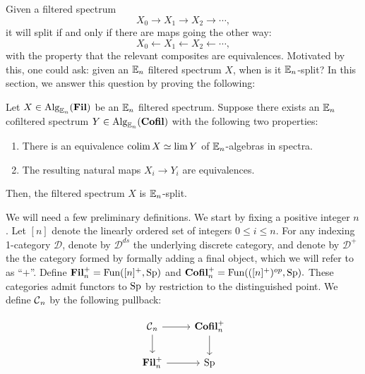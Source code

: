 
Given a filtered spectrum $$X_0\longrightarrow X_1 \longrightarrow X_2 \longrightarrow \cdots ,$$ it will split if and only if there are maps going the other way: $$X_0 \longleftarrow X_1 \longleftarrow X_2 \longleftarrow \cdots,$$ with the property that the relevant composites are equivalences.  Motivated by this, one could ask: given an $\operatorname{\mathbb{E}}_n$ filtered spectrum $X$, when is it $\operatorname{\mathbb{E}}_n$-split?  In this section, we answer this question by proving the following:

\begin{thm}\label{thm:SplitMachine}
Let $X\in \operatorname{\text{Alg}}_{\operatorname{\mathbb{E}}_n}(\operatorname{\textbf{Fil}})$ be an $\operatorname{\mathbb{E}}_n$ filtered spectrum.  Suppose there exists an $\operatorname{\mathbb{E}}_n$ cofiltered spectrum $Y\in \operatorname{\text{Alg}}_{\operatorname{\mathbb{E}}_n}(\operatorname{\textbf{Cofil}})$ with the following two properties:
\begin{enumerate}
\item There is an equivalence $\operatorname*{\text{colim}} X \simeq \lim Y$ of $\operatorname{\mathbb{E}}_n$-algebras in spectra.
\item The resulting natural maps $X_i \to Y_i$ are equivalences.  
\end{enumerate}
Then, the filtered spectrum $X$ is $\operatorname{\mathbb{E}}_n$-split.
\end{thm}



We will need a few preliminary definitions.  We start by fixing a positive integer $n$.  
Let $[n]$ denote the linearly ordered set of integers $0\leq i\leq n$. For any indexing 1-category $\mathcal{D}$, denote by $\mathcal{D}^{ds}$ the underlying discrete category, and denote by $\mathcal{D}^+$ the the category formed by formally adding a final object, which we will refer to as ``$+$''.  Define $\operatorname{\textbf{Fil}}_n^+ = \operatorname{\text{Fun}}([n]^+, \operatorname{\text{Sp}})$ and $\operatorname{\textbf{Cofil}}_n^+ = \operatorname{\text{Fun}}(([n]^+)^{op},\operatorname{\text{Sp}}).$  These categories admit functors to $\operatorname{\text{Sp}}$ by restriction to the distinguished point.  We define $\operatorname{\mathcal{C}}_n$ by the following pullback:

$$
\begin{tikzcd}
\C_n \arrow[r] \arrow[d]&  \Cofil_n^+ \arrow[d]\\
\Fil_n^+ \arrow[r]& \Sp
\end{tikzcd}
$$


